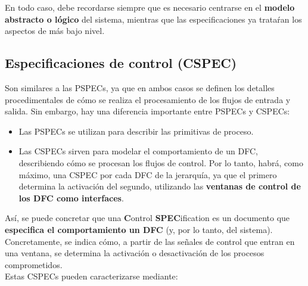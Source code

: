 En todo caso, debe recordarse siempre que es necesario centrarse en el \textbf{modelo abstracto o lógico} del sistema, mientras que las especificaciones ya trataŕan los aspectos de más bajo nivel.

\subsection{Especificaciones de control (CSPEC)}

Son similares a las PSPECs, ya que en ambos casos se definen los detalles procedimentales de cómo se realiza el procesamiento de los flujos de entrada y salida. Sin embargo, hay una diferencia importante entre PSPECs y CSPECs:

\begin{itemize}
    \item Las PSPECs se utilizan para describir las primitivas de proceso.
    \item Las CSPECs sirven para modelar el comportamiento de un DFC, describiendo cómo se procesan los flujos de control. Por lo tanto, habrá, como máximo, una CSPEC por cada DFC de la jerarquía, ya que el primero determina la activación del segundo, utilizando las \textbf{ventanas de control de los DFC como interfaces}.
\end{itemize}

Así, se puede concretar que una \textbf{C}ontrol \textbf{SPEC}ification es un documento que \textbf{especifica el comportamiento un DFC} (y, por lo tanto, del sistema). Concretamente, se indica cómo, a partir de las señales de control que entran en una ventana, se determina la activación o desactivación de los procesos comprometidos.\\

Estas CSPECs pueden caracterizarse mediante:

